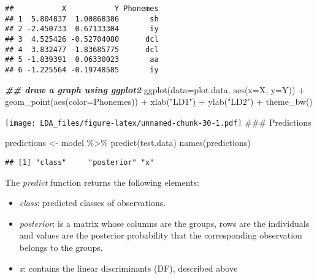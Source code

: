 \documentclass[
]{article}
\newenvironment{Shaded}{\begin{snugshade}}{\end{snugshade}}
\newcommand{\AttributeTok}[1]{\textcolor[rgb]{0.77,0.63,0.00}{#1}}
\newcommand{\DocumentationTok}[1]{\textcolor[rgb]{0.56,0.35,0.01}{\textbf{\textit{#1}}}}
\newcommand{\FunctionTok}[1]{\textcolor[rgb]{0.00,0.00,0.00}{#1}}
\newcommand{\NormalTok}[1]{#1}
\newcommand{\OtherTok}[1]{\textcolor[rgb]{0.56,0.35,0.01}{#1}}
\newcommand{\SpecialCharTok}[1]{\textcolor[rgb]{0.00,0.00,0.00}{#1}}
\newcommand{\StringTok}[1]{\textcolor[rgb]{0.31,0.60,0.02}{#1}}
\providecommand{\tightlist}{%
  \setlength{\itemsep}{0pt}\setlength{\parskip}{0pt}}
\begin{document}
\begin{verbatim}
##           X           Y Phonemes
## 1  5.804837  1.00868386       sh
## 2 -2.450733  0.67133304       iy
## 3  4.525426 -0.52704080      dcl
## 4  3.832477 -1.83685775      dcl
## 5 -1.839391  0.06330023       aa
## 6 -1.225564 -0.19748585       iy
\end{verbatim}

\begin{Shaded}
\begin{Highlighting}[]
\DocumentationTok{\#\# draw a graph using ggplot2}
\FunctionTok{ggplot}\NormalTok{(}\AttributeTok{data=}\NormalTok{plot.data, }\FunctionTok{aes}\NormalTok{(}\AttributeTok{x=}\NormalTok{X, }\AttributeTok{y=}\NormalTok{Y)) }\SpecialCharTok{+}
    \FunctionTok{geom\_point}\NormalTok{(}\FunctionTok{aes}\NormalTok{(}\AttributeTok{color=}\NormalTok{Phonemes)) }\SpecialCharTok{+}
    \FunctionTok{xlab}\NormalTok{(}\StringTok{"LD1"}\NormalTok{) }\SpecialCharTok{+} \FunctionTok{ylab}\NormalTok{(}\StringTok{"LD2"}\NormalTok{) }\SpecialCharTok{+}
    \FunctionTok{theme\_bw}\NormalTok{()}
\end{Highlighting}
\end{Shaded}

\texttt{[image: LDA\_files/figure-latex/unnamed-chunk-30-1.pdf]} \#\#\#
Predictions

\begin{Shaded}
\begin{Highlighting}[]
\NormalTok{predictions }\OtherTok{\textless{}{-}}\NormalTok{ model }\SpecialCharTok{\%\textgreater{}\%} \FunctionTok{predict}\NormalTok{(test.data)}
\FunctionTok{names}\NormalTok{(predictions)}
\end{Highlighting}
\end{Shaded}

\begin{verbatim}
## [1] "class"     "posterior" "x"
\end{verbatim}

The \emph{predict} function returns the following elements:

\begin{itemize}
\tightlist
\item
  \emph{class}: predicted classes of observations.
\item
  \emph{posterior}: is a matrix whose columns are the groups, rows are
  the individuals and values are the posterior probability that the
  corresponding observation belongs to the groups.
\item
  \emph{x}: contains the linear discriminants (DF), described above
\end{itemize}
\end{document}
